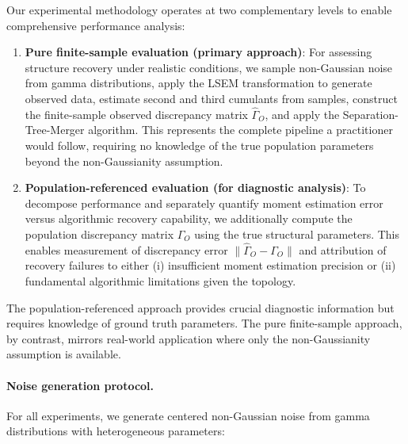 \documentclass[11pt,a4paper]{article}
\numberwithin{equation}{section}
\begin{document}
Our experimental methodology operates at two complementary levels to enable comprehensive performance analysis:

\begin{enumerate}[label=(\arabic*)]
\item \textbf{Pure finite-sample evaluation (primary approach)}: For assessing structure recovery under realistic conditions, we sample non-Gaussian noise from gamma distributions, apply the LSEM transformation to generate observed data, estimate second and third cumulants from samples, construct the finite-sample observed discrepancy matrix $\hat{\Gamma}_O$, and apply the Separation-Tree-Merger algorithm. This represents the complete pipeline a practitioner would follow, requiring no knowledge of the true population parameters beyond the non-Gaussianity assumption.

\item \textbf{Population-referenced evaluation (for diagnostic analysis)}: To decompose performance and separately quantify moment estimation error versus algorithmic recovery capability, we additionally compute the population discrepancy matrix $\Gamma_O$ using the true structural parameters. This enables measurement of discrepancy error $\|\hat{\Gamma}_O - \Gamma_O\|$ and attribution of recovery failures to either (i) insufficient moment estimation precision or (ii) fundamental algorithmic limitations given the topology.
\end{enumerate}

The population-referenced approach provides crucial diagnostic information but requires knowledge of ground truth parameters. The pure finite-sample approach, by contrast, mirrors real-world application where only the non-Gaussianity assumption is available.

\paragraph{Noise generation protocol.} For all experiments, we generate centered non-Gaussian noise from gamma distributions with heterogeneous parameters:
\end{document}

